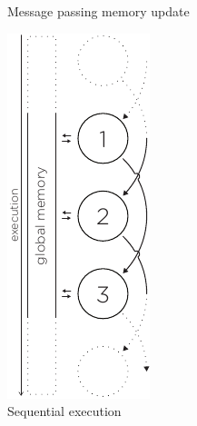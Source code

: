 \begin{figure}
\begin{minipage}[t]{0.23\textwidth}
      \caption{Message passing memory update}
      \label{fig:memory-update}
    \end{minipage}
  \hspace{1cm}
  \vrule
  \hspace{1cm}
    \begin{minipage}[t]{0.23\textwidth}
      \centering
      \includegraphics[page=4, height=2\linewidth]{../resources/invariance.pdf}
      \caption{Sequential execution}
      \label{fig:sequential-execution}
    \end{minipage}
  \end{figure}

